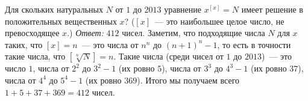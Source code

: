 \problem
Для скольких натуральных $N$ от $1$ до $2013$ уравнение $x^{[x]} = N$ имеет
решение в положительных вещественных $x$?
($[x]$~--- это наибольшее целое число, не превосходящее $x$.)
\solution
\emph{Ответ:} $412$ чисел.
Заметим, что подходящие числа $N$ для $x$ таких, что $[x] = n$~--- это числа от
$n^n$ до $(n+1)^n - 1$, то есть в точности такие числа, что
$[\sqrt[n]{N}] = n$.
Такие числа (среди чисел от $1$ до $2013$)~--- это
число $1$,
числа от $2^2$ до $3^2 - 1$ (их ровно $5$),
числа от $3^3$ до $4^3 - 1$ (их ровно $37$),
числа от $4^4$ до $5^4 - 1$ (их ровно $369$).
Итого мы получаем всего $1 + 5 + 37 + 369 = 412$ чисел.
\endproblem
